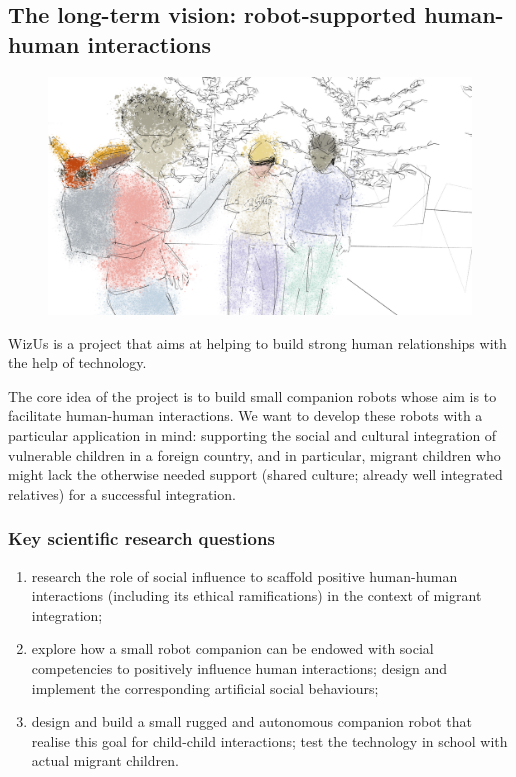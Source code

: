 \documentclass[11pt]{article}
\newcommand{\project}{WizUs\xspace}
\begin{document}
\subsection{The long-term vision: robot-supported human-human interactions}


\begin{figure}[!htbp]
    \centering
    \includegraphics[width=0.9\linewidth]{figs/render5-colors.png}
\end{figure}

\project is a project that aims at helping to build strong human
relationships with the help of technology.

The core idea of the project is to build small companion robots whose
aim is to facilitate human-human interactions. We want to develop these
robots with a particular application in mind: supporting the social and
cultural integration of vulnerable children in a foreign country, and in
particular, migrant children who might lack the otherwise needed support
(shared culture; already well integrated relatives) for a successful
integration.

\subsubsection{Key scientific research questions}

\begin{enumerate}
\item research the role of social influence to scaffold positive human-human
    interactions (including its ethical ramifications) in the context of migrant
    integration;
\item explore how a small robot companion can be endowed with social
    competencies to positively influence human interactions; design and
    implement the corresponding artificial social behaviours;
\item design and build a small rugged and autonomous companion robot that
    realise this goal for child-child interactions; test the technology in
    school with actual migrant children.
\end{enumerate}
\end{document}
